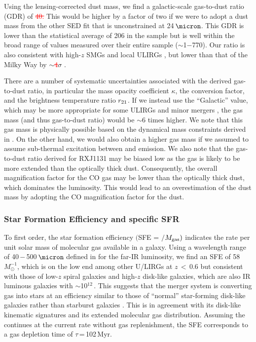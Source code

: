 \documentclass[]{emulateapj}
\newcommand{\new}[1]{\textcolor{blue}{\uwave{#1}}}
\newcommand{\old}[1]{\textcolor{red}{\st{#1}}} %
\begin{document}
Using the lensing-corrected dust mass, we find a galactic-scale
gas-to-dust ratio (GDR) of
\old{40.}\new{54\pmm13}
This would be higher by a factor of two if we were to adopt a dust mass from the other SED fit that is unconstrained at 24\,$\micron$.
This GDR is lower than the statistical average of 206
in the  sample but is well within the broad
range of values measured over their entire sample ($\sim$1$-$770).
Our ratio is also consistent with high-$z$ SMGs
\citep[]{Bothwell13a} and
local ULIRGs \citep{Wilson08a}, but lower than that of the Milky Way by
$\sim$\old{4}\new{7}$\sigma$ \citep[ignoring systematic uncertainties;][]{Li01a,Zubko04a,Draine07a}.

There are a number of systematic uncertainties associated with the derived gas-to-dust ratio, in particular
the mass opacity coefficient $\kappa$,
the \alphaco conversion factor, and the brightness temperature ratio $r_{\rm 21}$.
If we instead use the ``Galactic'' \alphaco value, which may be more appropriate for some ULIRGs \citep[\eg][]{Papadopoulos12a} and minor mergers \citep{Narayanan12a},
the gas mass (and thus gas-to-dust ratio) would be $\sim$6 times higher.
We note that this gas mass is physically possible based on the dynamical mass constraints derived in .
On the other hand, we would also obtain a higher gas mass if
we assumed to assume sub-thermal excitation between \bco and \aco emission.
We also note that the gas-to-dust ratio derived for RXJ1131 may be biased low as the gas is likely to
be more extended than the optically thick dust. Consequently, the overall magnification factor
for the CO gas may be lower than the optically thick dust, which dominates the \fir luminosity.
This would lead to an overestimation of the dust mass
by adopting the CO magnification factor for the dust.

\subsubsection{Star Formation Efficiency and specific SFR}

To first order, the star formation efficiency
$($SFE = \LFIR$/$$M_{\rm gas})$ indicates the \SF rate per unit solar mass of molecular gas available in a galaxy.
Using a wavelength range of 40\,$-$\,500\,$\micron$ defined
in  for the far-IR luminosity,
we find an SFE of 58 \Lsun $M_{\odot}^{-1}$,
which is on the low end among other U/LIRGs at $z$\,$<$\,0.6
\citep[;][]{Combes11a} but consistent with those of
low-$z$ spiral galaxies  and high-$z$ disk-like
galaxies, which are also IR luminous galaxies with \LIR$\sim$10$^{12}$\,\Msun \citep{Daddi08a, Daddi10a}.
This suggests that the merger system is converting gas into stars at an efficiency
similar to those of ``normal'' star-forming
disk-like galaxies rather than starburst galaxies
\citep[][]{Tacconi08a, Riechers11a}.
This is in agreement with its disk-like kinematic signatures and its extended molecular gas distribution.
Assuming the \SF continues at the current rate without gas replenishment,
the SFE corresponds to a
gas depletion time of $\tau$\,=\,102\,Myr.
\end{document}
